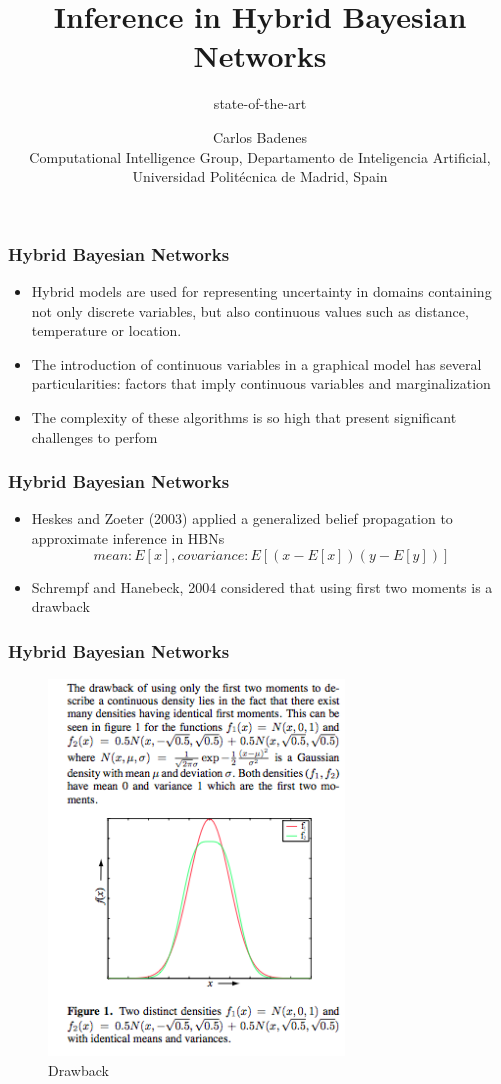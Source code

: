 \documentclass{beamer}
\title[Inference in HBNs]{Inference in Hybrid Bayesian Networks}
\subtitle{state-of-the-art}
\author[Carlos Badenes]{{Carlos Badenes}\\
{\small Computational Intelligence Group, Departamento de Inteligencia Artificial, Universidad Polit\'ecnica de Madrid, Spain}}
\date{}
\begin{document}
\frame{\titlepage}

\begin{frame}
	 \frametitle{Hybrid Bayesian Networks}
	\begin{itemize}
  	  \item Hybrid models are used for representing uncertainty in domains containing not only discrete variables, but also continuous values such as distance, temperature or location.

  	  \item The introduction of continuous variables in a graphical model has several particularities: factors that imply continuous variables and marginalization

	  \item The complexity of these algorithms is so high that present significant challenges to perfom
  	\end{itemize}
\end{frame}

\begin{frame}
	   \frametitle{Hybrid Bayesian Networks}
	\begin{itemize}
  	  \item Heskes and Zoeter (2003) applied a generalized belief propagation to approximate inference in HBNs\[
mean: E[x], covariance: E[(x-E[x])(y-E[y])]
\]	
  	  \item Schrempf and Hanebeck, 2004 considered that using  first two moments is a drawback
  	\end{itemize} 
\end{frame}

\begin{frame}
	   \frametitle{Hybrid Bayesian Networks}
		\begin{figure}
		  	\centering
    			\includegraphics[width=0.7\textwidth]{HBM-2004.png}
  			\caption{Drawback}
		\end{figure}
\end{frame}
\end{document}
